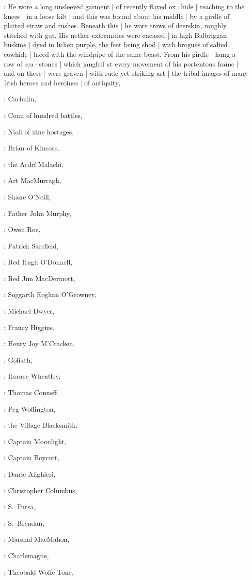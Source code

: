 :
He wore a long unsleeved garment |
of recently flayed ox·hide |
reaching to the knees |
in a loose kilt |
and this was bound about his middle |
by a girdle of plaited straw and rushes.
Beneath this |
he wore trews of deerskin,
roughly stitched with gut.
His nether extremities were encased |
in high Balbriggan buskins |
dyed in lichen purple,
the feet being shod |
with brogues of salted cowhide |
laced with the windpipe of the same beast.
From his girdle |
hung a row of sea·stones |
which jangled at every movement of his portentous frame |
and on these |
were graven |
with rude yet striking art |
the tribal images of many Irish heroes and heroines |
of antiquity,

:
Cuchulin,

:
Conn of hundred battles,

:
Niall of nine hostages,

:
Brian of Kincora,

:
the Ardrí Malachi,

:
Art MacMurragh,

:
Shane O'Neill,

:
Father John Murphy,

:
Owen Roe,

:
Patrick Sarsfield,

:
Red Hugh O'Donnell,

:
Red Jim MacDermott,
\stage[cheers]

:
Soggarth Eoghan O'Growney,

:
Michael Dwyer,

:
Francy Higgins,

:
Henry Joy M'Cracken,

:
Goliath,

:
Horace Wheatley,

:
Thomas Conneff,

:
Peg Woffington,

:
the Village Blacksmith,

:
Captain Moonlight,

:
Captain Boycott,

:
Dante Alighieri,

:
Christopher Columbus,

:
S.~Fursa,

:
S.~Brendan,

:
Marshal MacMahon,

:
Charlemagne,

:
Theobald Wolfe Tone,

